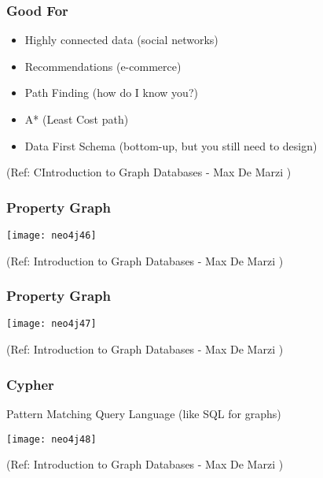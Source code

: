 \begin{frame}\frametitle{Good For}

\begin{itemize}
\item Highly connected data (social networks)
\item Recommendations (e-commerce)
\item Path Finding (how do I know you?)
\item A* (Least Cost path)
\item  Data First Schema (bottom-up, but you still need to design)
\end{itemize}

{\tiny (Ref: CIntroduction to Graph Databases - Max De Marzi )}
\end{frame}

\begin{frame}\frametitle{Property Graph}

\begin{center}
\texttt{[image: neo4j46]}
\end{center}	

{\tiny (Ref: Introduction to Graph Databases - Max De Marzi )}
\end{frame}

\begin{frame}\frametitle{Property Graph}

\begin{center}
\texttt{[image: neo4j47]}
\end{center}	

{\tiny (Ref: Introduction to Graph Databases - Max De Marzi )}
\end{frame}

\begin{frame}\frametitle{Cypher}

Pattern Matching Query Language (like SQL for graphs)

\begin{center}
\texttt{[image: neo4j48]}
\end{center}	

{\tiny (Ref: Introduction to Graph Databases - Max De Marzi )}
\end{frame}

